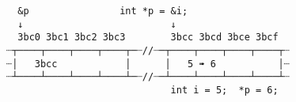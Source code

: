 \documentclass[varwidth=20cm,crop]{standalone}
\begin{document}
\begin{verbatim}
  &p                int *p = &i;
  ↓                          ↓
  3bc0 3bc1 3bc2 3bc3        3bcc 3bcd 3bce 3bcf
┈┬────┬────┬────┬────┬─┈//┈─┬────┬────┬────┬────┬┈
┈│   3bcc            │      │   5 ➠ 6           │┈
┈┴────┴────┴────┴────┴─┈//┈─┴────┴────┴────┴────┴┈
                             int i = 5;  *p = 6;
\end{verbatim}
\end{document}
